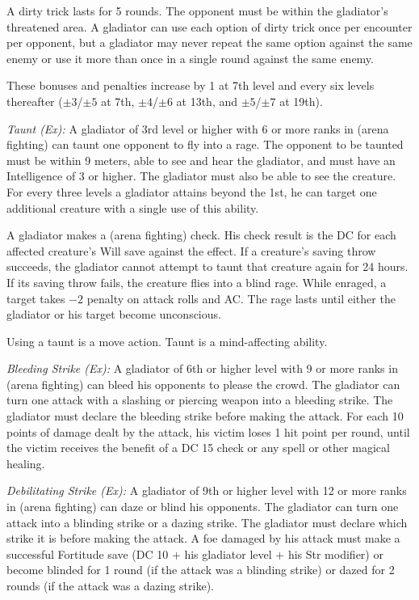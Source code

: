 A dirty trick lasts for 5 rounds. The opponent must be within the gladiator's threatened area. A gladiator can use each option of dirty trick once per encounter per opponent, but a gladiator may never repeat the same option against the same enemy or use it more than once in a single round against the same enemy.

These bonuses and penalties increase by 1 at 7th level and every six levels thereafter ($\pm3$/$\pm5$ at 7th, $\pm4$/$\pm6$ at 13th, and $\pm5$/$\pm7$ at 19th).


\textit{Taunt (Ex):} A gladiator of 3rd level or higher with 6 or more ranks in  (arena fighting) can taunt one opponent to fly into a rage. The opponent to be taunted must be within 9 meters, able to see and hear the gladiator, and must have an Intelligence of 3 or higher. The gladiator must also be able to see the creature. For every three levels a gladiator attains beyond the 1st, he can target one additional creature with a single use of this ability.

A gladiator makes a  (arena fighting) check. His check result is the DC for each affected creature's Will save against the effect. If a creature's saving throw succeeds, the gladiator cannot attempt to taunt that creature again for 24 hours. If its saving throw fails, the creature flies into a blind rage. While enraged, a target takes $-2$ penalty on attack rolls and AC. The rage lasts until either the gladiator or his target become unconscious.

Using a taunt is a move action. Taunt is a mind-affecting ability.

\textit{Bleeding Strike (Ex):} A gladiator of 6th or higher level with 9 or more ranks in  (arena fighting) can bleed his opponents to please the crowd. The gladiator can turn one attack with a slashing or piercing weapon into a bleeding strike. The gladiator must declare the bleeding strike before making the attack. For each 10 points of damage dealt by the attack, his victim loses 1 hit point per round, until the victim receives the benefit of a DC 15  check or any  spell or other magical healing.

\textit{Debilitating Strike (Ex):} A gladiator of 9th or higher level with 12 or more ranks in  (arena fighting) can daze or blind his opponents. The gladiator can turn one attack into a blinding strike or a dazing strike. The gladiator must declare which strike it is before making the attack. A foe damaged by his attack must make a successful Fortitude save (DC 10 + \onehalf his gladiator level + his Str modifier) or become blinded for 1 round (if the attack was a blinding strike) or dazed for 2 rounds (if the attack was a dazing strike).


